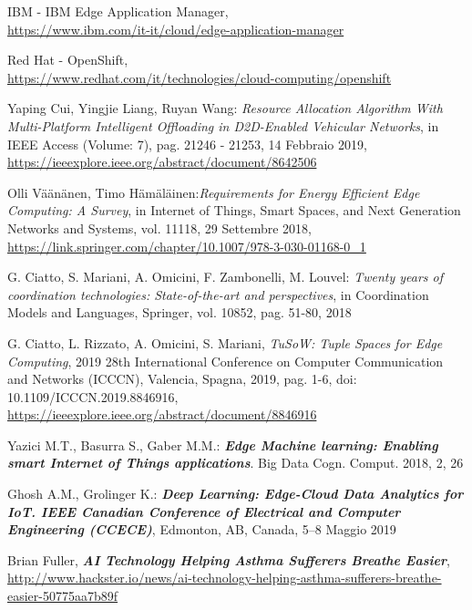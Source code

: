 \documentclass[a4paper,12pt,oneside]{book}
\begin{document}
\begin{thebibliography}{9}
	IBM - IBM Edge Application Manager,
	\\\url{https://www.ibm.com/it-it/cloud/edge-application-manager}
	
	Red Hat - OpenShift,
	\\\url{https://www.redhat.com/it/technologies/cloud-computing/openshift}
	
	Yaping Cui, Yingjie Liang, Ruyan Wang: \textit{Resource Allocation Algorithm With Multi-Platform Intelligent Offloading in D2D-Enabled Vehicular Networks}, in IEEE Access (Volume: 7), pag. 21246 - 21253, 14 Febbraio 2019,
	\\\url{https://ieeexplore.ieee.org/abstract/document/8642506}
	
	Olli Väänänen, Timo Hämäläinen:\textit{Requirements for Energy Efficient Edge Computing: A Survey}, in Internet of Things, Smart Spaces, and Next Generation Networks and Systems, vol. 11118,  29 Settembre 2018,
	\\\url{https://link.springer.com/chapter/10.1007/978-3-030-01168-0_1}
	
	G. Ciatto, S. Mariani, A. Omicini, F. Zambonelli, M. Louvel: \textit{Twenty years of coordination technologies: State-of-the-art and perspectives}, in Coordination Models and Languages, Springer, vol. 10852, pag. 51-80, 2018
	
	G. Ciatto, L. Rizzato, A. Omicini, S. Mariani, \textit{TuSoW: Tuple Spaces for Edge Computing}, 2019 28th International Conference on Computer Communication and Networks (ICCCN), Valencia, Spagna, 2019, pag. 1-6, doi: 10.1109/ICCCN.2019.8846916,
	\\\url{https://ieeexplore.ieee.org/abstract/document/8846916}
	
	Yazici M.T., Basurra S., Gaber M.M.:  \textbf{\textit{Edge Machine learning: Enabling smart Internet of Things applications}}. Big Data Cogn. Comput. 2018, 2, 26
	
	Ghosh A.M., Grolinger K.: \textbf{\textit{Deep Learning: Edge-Cloud Data Analytics for IoT. IEEE Canadian Conference of Electrical and Computer Engineering (CCECE)}}, Edmonton, AB, Canada, 5–8 Maggio 2019
	
	Brian Fuller, \textbf{\textit{AI Technology Helping Asthma Sufferers Breathe Easier}},
	\\\url{http://www.hackster.io/news/ai-technology-helping-asthma-sufferers-breathe-easier-50775aa7b89f}
	

\end{thebibliography}
\end{document}
